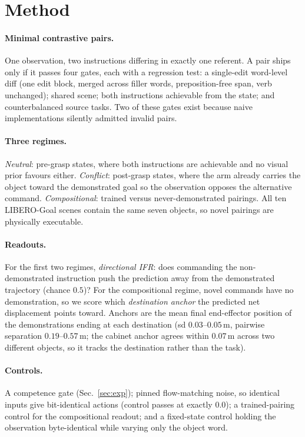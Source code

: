 \documentclass{article}
\begin{document}
\section{Method}
\label{sec:method}

\paragraph{Minimal contrastive pairs.} One observation, two instructions differing in exactly one
referent. A pair ships only if it passes four gates, each with a regression test: a single-edit
word-level diff (one edit block, merged across filler words, preposition-free span, verb
unchanged); shared scene; both instructions achievable from the state; and counterbalanced source
tasks. Two of these gates exist because naive implementations silently admitted invalid pairs.

\paragraph{Three regimes.} \emph{Neutral}: pre-grasp states, where both instructions are
achievable and no visual prior favours either. \emph{Conflict}: post-grasp states, where the arm
already carries the object toward the demonstrated goal so the observation opposes the
alternative command. \emph{Compositional}: trained versus never-demonstrated pairings. All ten
LIBERO-Goal scenes contain the same seven objects, so novel pairings are physically executable.

\paragraph{Readouts.} For the first two regimes, \emph{directional IFR}: does commanding the
non-demonstrated instruction push the prediction away from the demonstrated trajectory (chance
$0.5$)? For the compositional regime, novel commands have no demonstration, so we score which
\emph{destination anchor} the predicted net displacement points toward. Anchors are the mean
final end-effector position of the demonstrations ending at each destination (sd
$0.03$--$0.05$\,m, pairwise separation $0.19$--$0.57$\,m; the cabinet anchor agrees within
$0.07$\,m across two different objects, so it tracks the destination rather than the task).

\paragraph{Controls.} A competence gate (Sec.~\ref{sec:exp}); pinned flow-matching noise, so
identical inputs give bit-identical actions (control passes at exactly $0.0$); a trained-pairing
control for the compositional readout; and a fixed-state control holding the observation
byte-identical while varying only the object word.
\end{document}
